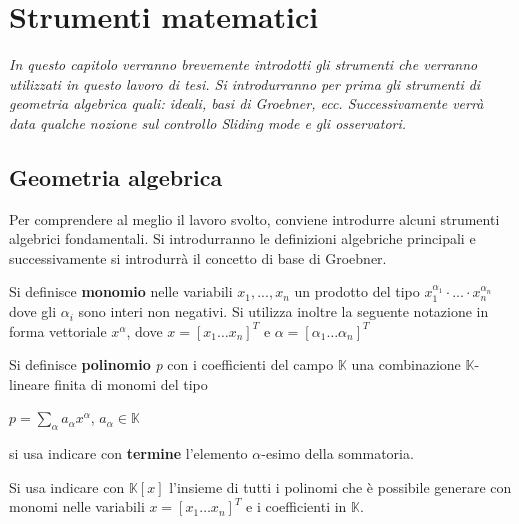 \chapter{Strumenti matematici}
\label{chap:mat}

\begin{minipage}{12cm}\textit{In questo capitolo verranno brevemente introdotti gli strumenti che verranno utilizzati in questo lavoro di tesi. Si introdurranno per prima gli strumenti di geometria algebrica quali: ideali, basi di Groebner, ecc. Successivamente verrà data qualche nozione sul controllo Sliding mode e gli osservatori.}
\end{minipage}

\vspace*{1cm}

\section{Geometria algebrica}
\label{sec:Geom}

Per comprendere al meglio il lavoro svolto, conviene introdurre alcuni strumenti algebrici fondamentali. Si introdurranno le definizioni algebriche principali e successivamente si introdurrà il concetto di base di Groebner. 

\begin{defn}Si definisce \textbf{monomio} nelle variabili \textit{$x_1, ..., x_n$} un prodotto del tipo $x_1^{\alpha_1} \cdot ... \cdot x_n^{\alpha_n}$ dove gli $\alpha_i$ sono interi non negativi. Si utilizza inoltre la seguente notazione in forma vettoriale \textbf{$x^\alpha$}, dove $x = [x_1 \dots x_n]^T$ e $\alpha = [\alpha_1 \dots \alpha_n]^T$ 	
\end{defn}

\begin{defn}Si definisce \textbf{polinomio} \textit{p} con i coefficienti del campo $\mathbb{K}$ una combinazione $\mathbb{K}$-lineare finita di monomi del tipo
	\begin{center}
		$p = \sum_{\alpha}^{} a_\alpha x^{\alpha}$, $a_\alpha \in \mathbb{K}$
	\end{center}
	si usa indicare con \textbf{termine} l'elemento $\alpha$-esimo della sommatoria.	
\end{defn}

\begin{defn}
	Si usa indicare con $\mathbb{K}[x]$ l'insieme di tutti i polinomi che è possibile generare con monomi nelle variabili $x = [x_1 \dots x_n]^T$ e i coefficienti in $\mathbb{K}$.
\end{defn}

